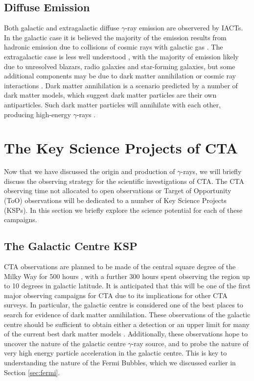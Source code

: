 \subsection{Diffuse Emission}
Both galactic and extragalactic diffuse $\gamma$-ray emission are observered by IACTs. In the galactic case it is believed the majority of the emission results from hadronic emission due to collisions of cosmic rays with galactic gas \cite{extragamma}. The extragalactic case is less well understood \cite{extragamma}, with the majority of emission likely due to unresolved blazars, radio galaxies and star-forming galaxies, but some additional components may be due to dark matter annihilation or cosmic ray interactions \cite{extragamma}. Dark matter annihilation is a scenario predicted by a number of dark matter models, which suggest dark matter particles are their own antiparticles. Such dark matter particles will annihilate with each other, producing high-energy $\gamma$-rays \cite{scienceCTA}.

\section{The Key Science Projects of CTA}
Now that we have discussed the origin and production of $\gamma$-rays, we will briefly discuss the observing strategy for the scientific investigations of CTA. The CTA observing time not allocated to open observations or Target of Opportunity (ToO) observations will be dedicated to a number of Key Science Projects (KSPs). In this section we briefly explore the science potential for each of these campaigns.

\subsection{The Galactic Centre KSP}
CTA observations are planned to be made of the central square degree of the Milky Way for 500 hours \cite{scienceCTA}, with a further 300 hours spent observing the region up to 10 degrees in galactic latitude. It is anticipated that this will be one of the first major observing campaigns for CTA due to its implications for other CTA surveys. In particular, the galactic centre is considered one of the best places to search for evidence of dark matter annihilation. These observations of the galactic centre should be sufficient to obtain either a detection or an upper limit for many of the current best dark matter models \cite{scienceCTA}. Additionally, these observations hope to uncover the nature of the galactic centre $\gamma$-ray source, and to probe the nature of very high energy particle acceleration in the galactic centre. This is key to understanding the nature of the Fermi Bubbles, which we discussed earlier in Section \ref{sec:fermi}. 

